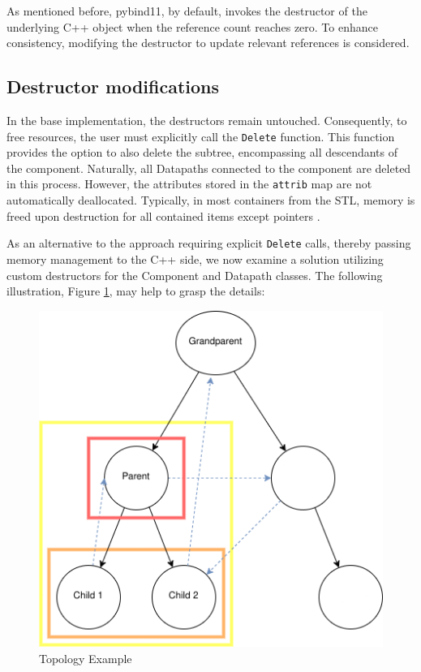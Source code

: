 As mentioned before, pybind11, by default, invokes the destructor of the underlying C++ object when the reference count reaches zero. To enhance consistency, modifying the destructor to update relevant references is considered. 

\subsection{Destructor modifications}

In the base implementation, the destructors remain untouched. Consequently, to free resources, the user must explicitly call the \verb|Delete| function. This function provides the option to also delete the subtree, encompassing all descendants of the component. Naturally, all Datapaths connected to the component are deleted in this process. However, the attributes stored in the \verb|attrib| map are not automatically deallocated. Typically, in most containers from the \ac{STL}, memory is freed upon destruction for all contained items except pointers \cite{cppreference-map-destructor}.

As an alternative to the approach requiring explicit \verb|Delete| calls, thereby passing memory management to the C++ side, we now examine a solution utilizing custom destructors for the Component and Datapath classes. The following illustration, Figure \ref{fig:topo-example}, may help to grasp the details:
\begin{figure}[htpb]
    \centering
    \includegraphics[scale=0.5]{figures/Topo-example.png}
    \caption{Topology Example}
    \label{fig:topo-example}
\end{figure}

